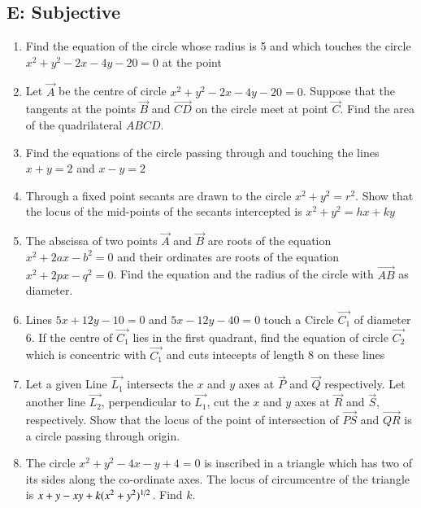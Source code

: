 \documentclass[journal,12pt,twocolumn]{IEEEtran}
\theoremstyle{remark}
\begin{document}
\subsection*{E: Subjective}
\begin{enumerate}
\item Find the equation of the circle whose radius is 5 and which touches the circle $x^2+y^2-2x-4y-20=0$ at the point 

\hfill {}
\item Let $\vec{A}$ be the centre of circle $x^2+y^2-2x-4y-20=0$. Suppose that the tangents at the points $\vec{B}$ and $\vec{CD}$  on the circle meet at point $\vec{C}$. Find the area of the quadrilateral $ABCD$.

\hfill {}
\item Find the equations of the circle passing through  and touching the lines $x+y=2$ and $x-y=2$

\hfill {}
\item Through a fixed point  secants are drawn to the circle $x^2+y^2=r^2$. Show that the locus of the mid-points of the secants intercepted is $x^2+y^2=hx+ky$

\hfill {}
\item The abscissa of two points $\vec{A}$ and $\vec{B}$ are roots of the equation $x^2+2ax-b^2=0$ and their ordinates are roots of the equation $x^2+2px-q^2=0$. Find the equation and the radius of the circle with $\vec{AB}$ as diameter.

\hfill {}
\item Lines $5x+12y-10=0$ and $5x-12y-40=0$ touch a Circle $\vec{C_1}$ of diameter 6. If the centre of $\vec{C_1}$ lies in the first quadrant, find the equation of circle $\vec{C_2}$ which is concentric with $\vec{C_1}$ and cuts intecepts of length 8 on these lines

\hfill {}
\item Let a given Line $\vec{L_1}$ intersects the $x$ and $y$ axes at $\vec{P}$ and $\vec{Q}$ respectively. Let another line $\vec{L_2}$, perpendicular to $\vec{L_1}$, cut the $x$ and $y$ axes at $\vec{R}$ and $\vec{S}$, respectively. Show that the locus of the point of intersection of $\vec{PS}$ and $\vec{QR}$ is a circle passing through origin.

\hfill {}
\item The circle $x^2+y^2-4x-y+4=0$ is inscribed in a triangle which has two of its sides along the co-ordinate axes. The locus of circumcentre of the triangle is $x+y-xy+k(x^2+y^2)\textsuperscript{1/2}$. Find $k$.


\end{enumerate}
\end{document}
